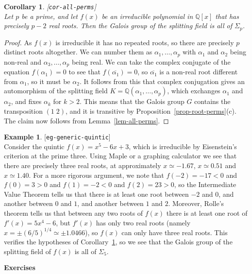 \documentclass{amsart}
\newcommand{\lbl}[1]{\label{#1}\textup{[\texttt{#1}]}\ \\}
\newcommand{\lbl}{\label}
\newcommand{\Q}         {{\mathbb{Q}}}
\newcommand{\al}        {\alpha}
\newcommand{\Sg}        {\Sigma}
\newcommand{\ov}[1]     {\overline{#1}}
\renewcommand{\:}{\colon}
\newtheorem{corollary}[theorem]{Corollary}
\theoremstyle{definition}
\newtheorem{example}[theorem]{Example}
\begin{document}
\begin{corollary}\lbl{cor-all-perms}
 Let $p$ be a prime, and let $f(x)$ be an irreducible polynomial in
 $\Q[x]$ that has precisely $p-2$ real roots.  Then the Galois group
 of the splitting field is all of $\Sg_p$.
\end{corollary}
\begin{proof}
 As $f(x)$ is irreducible it has no repeated roots, so there are
 precisely $p$ distinct roots altogether.  We can number them as
 $\al_1,\dotsc,\al_p$ with $\al_1$ and $\al_2$ being non-real and
 $\al_3,\dotsc,\al_p$ being real.  We can take the complex conjugate
 of the equation $f(\al_1)=0$ to see that $f(\ov{\al_1})=0$, so
 $\ov{\al_1}$ is a non-real root different from $\al_1$, so it must be
 $\al_2$.  It follows from this that complex conjugation gives an
 automorphism of the splitting field $K=\Q(\al_1,\dotsc,\al_p)$, which
 exchanges $\al_1$ and $\al_2$, and fixes $\al_k$ for $k>2$.  This
 means that the Galois group $G$ contains the transposition $(1\;2)$,
 and it is transitive by Proposition~\ref{prop-root-perms}(c).  The
 claim now follows from Lemma~\ref{lem-all-perms}.
\end{proof}

\begin{example}\lbl{eg-generic-quintic}
 Consider the quintic $f(x)=x^5-6x+3$, which is irreducible by
 Eisenstein's criterion at the prime three.  Using Maple or a graphing
 calculator we see that there are precisely three real roots, at
 approximately $x\simeq -1.67$, $x\simeq 0.51$ and $x\simeq 1.40$.
 For a more rigorous argument, we note that $f(-2)=-17<0$ and
 $f(0)=3>0$ and $f(1)=-2<0$ and $f(2)=23>0$, so the Intermediate Value
 Theorem tells us that there is at least one root between $-2$ and
 $0$, and another between $0$ and $1$, and another between $1$ and
 $2$.  Moreover, Rolle's theorem tells us that between any two roots
 of $f(x)$ there is at least one root of $f'(x)=5x^4-6$, but $f'(x)$
 has only two real roots (namely $x=\pm(6/5)^{1/4}\simeq\pm 1.0466$),
 so $f(x)$ can only have three real roots.  This verifies the
 hypotheses of Corollary~\ref{cor-all-perms}, so we see that the
 Galois group of the splitting field of $f(x)$ is all of $\Sg_5$.
\end{example}


\begin{center}
 \Large \textbf{Exercises}
\end{center}
\end{document}
